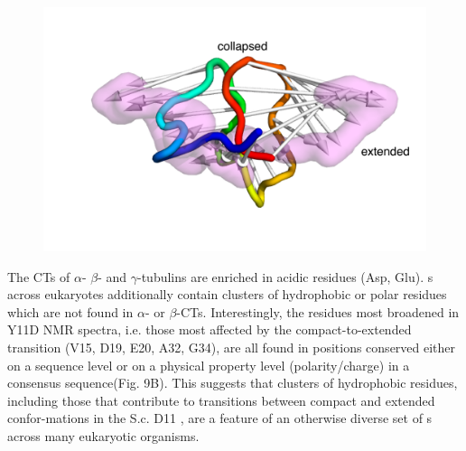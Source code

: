 \begin{figure}
\includegraphics[scale=0.5]{figures/yd_porcupine.png}
\end{figure}

The CTs of $\alpha$- $\beta$- and $\gamma$-tubulins are enriched in acidic residues (Asp, Glu). \gct{} s across eukaryotes additionally contain clusters of hydrophobic or polar residues which are not found in $\alpha$- or $\beta$-CTs. Interestingly, the residues most broadened in Y11D NMR spectra, i.e. those most affected by the compact-to-extended transition (V15, D19, E20, A32, G34), are all found in positions conserved either on a sequence level or on a physical property level (polarity/charge) in a consensus \gct{} sequence(Fig. 9B). This suggests that clusters of hydrophobic residues, including those that contribute to transitions between compact and extended confor-mations in the S.c. D11 \gct{}, are a feature of an otherwise diverse set of \gct{} s across many eukaryotic organisms.  


